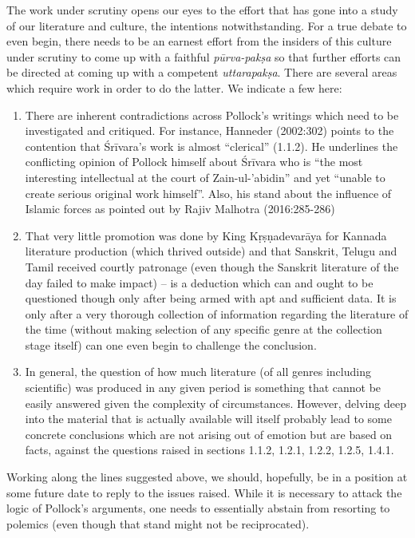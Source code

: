 The work under scrutiny opens our eyes to the effort that has gone into a study of our literature and culture, the intentions notwithstanding. For a true debate to even begin, there needs to be an earnest effort from the insiders of this culture under scrutiny to come up with a faithful {\sl pūrva-pakṣa} so that further efforts can be directed at coming up with a competent {\sl uttarapakṣa}. There are several areas which require work in order to do the latter. We indicate a few here:
\renewcommand\theenumi{\alph{enumi}}
\renewcommand\labelenumi{(\theenumi)}
\begin{enumerate}
\item There are inherent contradictions across Pollock's writings which need to be investigated and critiqued. For instance, Hanneder (2002:302) points to the contention that Śrīvara’s work is almost “clerical” (1.1.2). He underlines the conflicting opinion of Pollock himself about Śrīvara who is “the most interesting intellectual at the court of Zain-ul-'abidin” and yet “unable to create serious original work himself”. Also, his stand about the influence of Islamic forces as pointed out by Rajiv Malhotra (2016:285-286)
\item That very little promotion was done by King Kṛṣṇadevarāya for Kannada literature production (which thrived outside) and that Sanskrit, Telugu and Tamil received courtly patronage (even though the Sanskrit literature of the day failed to make impact) – is a deduction which can and ought to be questioned though only after being armed with apt and sufficient data. It is only after a very thorough collection of information regarding the literature of the time (without making selection of any specific genre at the collection stage itself) can one even begin to challenge the conclusion.
\item In general, the question of how much literature (of all genres including scientific) was produced in any given period is something that cannot be easily answered given the complexity of circumstances. However, delving deep into the material that is actually available will itself probably lead to some concrete conclusions which are not arising out of emotion but are based on facts, against the questions raised in sections 1.1.2, 1.2.1, 1.2.2, 1.2.5,  1.4.1.
\end{enumerate}

Working along the lines suggested above, we should, hopefully, be in a position at some future date to reply to the issues raised. While it is necessary to attack the logic of Pollock’s arguments, one needs to essentially abstain from resorting to polemics (even though that stand might not be reciprocated). 

